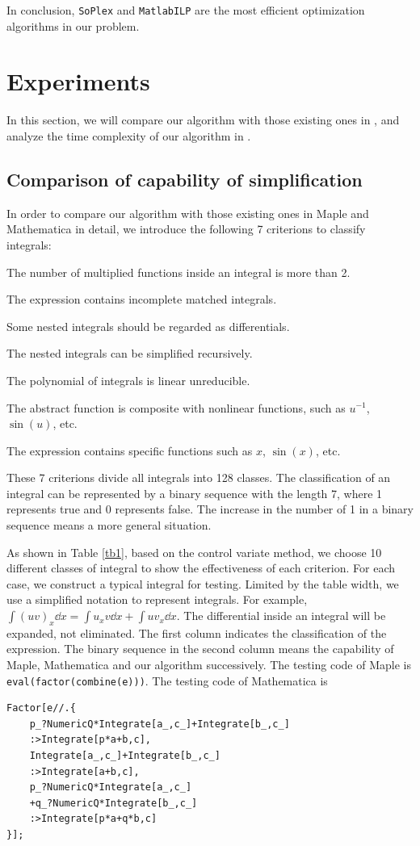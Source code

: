 In conclusion, \texttt{SoPlex} and \texttt{MatlabILP} are the most efficient optimization algorithms in our problem.

\section{Experiments} \label{Results-03}
In this section, we will compare our algorithm with those existing ones in , and analyze the time complexity of our algorithm in .

\subsection{Comparison of capability of simplification}\label{sec5.1-03}
In order to compare our algorithm with those existing ones in Maple and Mathematica in detail,  we introduce the following 7 criterions to classify integrals:
\begin{compactenum}[1) ]
\item The number of multiplied functions inside an integral is more than 2.
\item The expression contains incomplete matched integrals.
\item Some nested integrals should be regarded as differentials.
\item The nested integrals can be simplified recursively. 
\item The polynomial of integrals is linear unreducible.
\item The abstract function is composite with nonlinear functions, such as $u^{-1}$, $\sin(u)$, etc.  
\item The expression contains specific functions such as $x$, $\sin(x)$, etc. 
\end{compactenum} 
These 7 criterions divide all integrals into 128 classes. The classification of an integral can be represented by a binary sequence with the length 7, where 1 represents true and 0 represents false. The increase in the number of 1 in a binary sequence means a more general situation.

As shown in Table \ref{tb1}, based on the control variate method, we choose 10 different classes of integral to show the effectiveness of each criterion. For each case, we construct a typical integral for testing. Limited by the table width, we use a simplified notation to represent integrals. For example, $\int\!{(uv)_x\dd x}=\int\!{u_xv\dd x}+\int\!{uv_x\dd x}$. The differential inside an integral will be expanded, not eliminated. The first column indicates the classification of the expression. The binary sequence in the second column means the capability of Maple, Mathematica and our algorithm successively. The testing code of Maple is \texttt{eval(factor(combine(e)))}. The testing code of Mathematica is 
\begin{verbatim}
Factor[e//.{
    p_?NumericQ*Integrate[a_,c_]+Integrate[b_,c_]
    :>Integrate[p*a+b,c],
    Integrate[a_,c_]+Integrate[b_,c_]
    :>Integrate[a+b,c],
    p_?NumericQ*Integrate[a_,c_]
    +q_?NumericQ*Integrate[b_,c_]
    :>Integrate[p*a+q*b,c]
}];
\end{verbatim}

